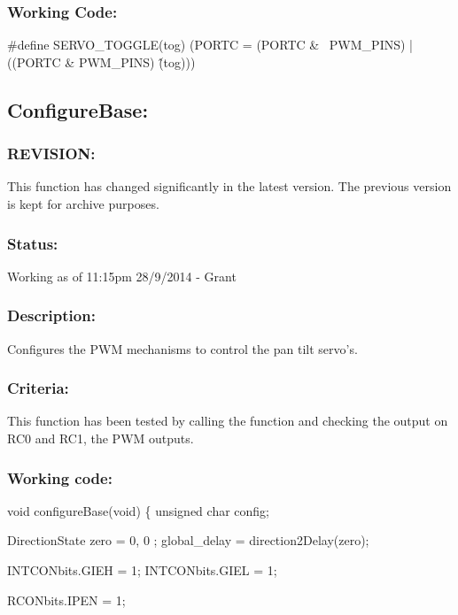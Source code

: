 \documentclass[]{article}
\begin{document}
\subsubsection{Working Code:}
\#define SERVO\_TOGGLE(tog) (PORTC = (PORTC \& ~PWM\_PINS) | ((PORTC \& PWM\_PINS) \^ (tog)))

\subsection{ConfigureBase:}
\subsubsection{REVISION:}
This function has changed significantly in the latest version. The previous version is kept for archive purposes.

\subsubsection{Status:}
Working as of 11:15pm 28/9/2014 - Grant

\subsubsection{Description:}
Configures the PWM mechanisms to control the pan tilt servo's.

\subsubsection{Criteria:}
This function has been tested by calling the function and checking the output on RC0 and RC1, the PWM outputs.

\subsubsection{Working code:}
void configureBase(void) \newline
\{\newline
	unsigned char config;\newline
	
	DirectionState zero = { 0, 0 };\newline
	global\_delay = direction2Delay(zero);\newline
	
	INTCONbits.GIEH = 1;\newline
	INTCONbits.GIEL = 1;\newline
	
	RCONbits.IPEN = 1;\newline
	
\end{document}
